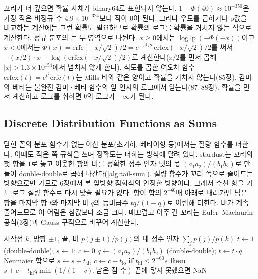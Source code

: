 꼬리가 더 깊으면 확률 자체가 binary64로 표현되지 않는다. $1-\Phi(40)\approx10^{-350}$은 가장 작은 비정규 수 $4.9\times10^{-324}$보다 작아 $0$이 된다. 그러나 우도를 곱하거나 p값을 비교하는 계산에는 그런 확률도 필요하므로 확률의 로그를 확률을 거치지 않는 식으로 계산한다. 정규 분포의 는 두 영역으로 나뉜다. $x\ge0$에서는 $\operatorname{log1p}(-\Phi(-x))$이고 $x<0$에서는 $\Phi(x)=\mathrm{erfc}(-x/\sqrt2)/2=e^{-x^2/2}\,\mathrm{erfcx}(-x/\sqrt2)/2$를 써서 $-(x/2)\cdot x+\log(\mathrm{erfcx}(-x/\sqrt2)/2)$로 계산한다($x/2$를 먼저 곱해 $|x|>1.3\times10^{154}$에서 넘치지 않게 한다). 척도를 곱한 여오차 함수 $\mathrm{erfcx}(t)=e^{t^2}\mathrm{erfc}(t)$는 Mills 비와 같은 양이고 확률을 거치지 않는다(85장). 감마와 베타는 불완전 감마·베타 함수의 앞 인자의 로그에서 얻는다(87--88장). 확률을 먼저 계산하고 로그를 취하면 $0$의 로그가 $-\infty$가 된다.

\subsection{Discrete Distribution Functions as Sums}

닫힌 꼴의 분포 함수가 없는 이산 분포(초기하, 베타이항 등)에서는 질량 함수를 더한다. 이때도 작은 쪽 규칙을 쓰며 정확도는 더하는 방식에 달려 있다. stardust는 꼬리의 첫 항을 $1$로 놓고 이웃한 항의 비를 정확한 정수 인자 넷의 몫 $(a_1a_2)/(b_1b_2)$로 만들어 double-double로 곱해 나간다(\cref{alg:tail-sum}). 질량 함수가 꼬리 쪽으로 줄어드는 방향으로만 가므로 6장에서 본 앞방향 점화식의 안정한 방향이다. 그래서 수천 항을 가도 로그 질량 함수로 다시 맞출 필요가 없다. 항이 합의 $2^{-60}$배 아래로 내려가면 남은 항을 마지막 항 $t$와 마지막 비 $q$의 등비급수 $tq/(1-q)$로 어림해 더한다. 비가 계속 줄어드므로 이 어림은 참값보다 조금 크다. 매끄럽고 아주 긴 꼬리는 Euler--Maclaurin 공식(3장)과 Gauss 구적으로 바꾸어 계산한다.

\begin{algorithm}[htbp]
\begin{algorithmic}[1]
\Require 시작점 $k$, 방향 $\pm1$, 끝, 비 $p(j\pm1)/p(j)$의 네 정수 인자
\Ensure $\sum_jp(j)/p(k)$
\State $t\gets1$ (double-double); $s\gets1$; $c\gets0$
  \State $q\gets(a_1a_2)/(b_1b_2)$ (double-double); $t\gets t\cdot q$
  \State Neumaier 합으로 $s\gets s+t_{\mathrm{hi}}$, $c\gets c+t_{\mathrm{lo}}$
  \State \textbf{if} $t_{\mathrm{hi}}\le2^{-60}s$ \textbf{then} \Return $s+c+t_{\mathrm{hi}}q\min(1/(1-q),\text{남은 점 수})$
\EndFor
\State 끝에 닿지 못했으면 NaN 
\end{algorithmic}
\caption{비 점화식으로 더하는 이산 꼬리 (stardust 의 )}
\label{alg:tail-sum}
\end{algorithm}

